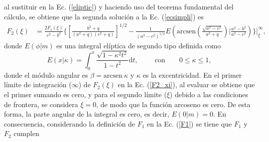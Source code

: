 al sustituir en la Ec. (\ref{eliptic}) y haciendo uso del teorema fundamental del cálculo, se obtiene que la segunda solución a la Ec. (\ref{ecsimpli}) es 
\begin{align}
    F_2(\xi)&=\frac{2F_1(\xi)}{c^2-b^2}\Bigg\{\left[\frac{b^2+q}{(a^2+q)(c^2+q)}\right]^{1/2}-\frac{1}{(a^2-c^2)^{1/2}}E\left(\mbox{arcsen}\left(\frac{\sqrt{a^2-c^2}}{a^2+q}\right)\Bigg|\frac{a^2-b^2}{a^2-c^2}\right)\Bigg\}\Bigg|_\xi^{\infty},
    \label{F2_xi}
\end{align}
donde $E(\phi|m)$ es una integral elíptica de segundo tipo definida como  \cite{Abramowitz}
\begin{equation}
    E(x|\kappa)=\int_{0}^x\frac{\sqrt{1-\kappa^2t^2}}{1-t^2}\text{d}t,\hspace{1cm}\text{con}\qquad 0\leq \kappa\leq 1,
\end{equation}
donde el módulo angular es $\beta=\mbox{arcsen}\:\kappa$ y $\kappa$ es la excentricidad. En el primer límite de integración ($\infty$) de $F_2(\xi)$ en la Ec. (\ref{F2_xi}), al evaluar se obtiene que el primer sumando es cero, y para el segundo límite ($\xi$) debido a las condiciones de frontera, se considera $\xi=0$, de modo que la función arcoseno es cero. De esta forma, la parte angular de la integral es cero, es decir, $E(0|m)=0$. En consecuencia, considerando la definición de $F_1$ en la Ec. (\ref{F1}) se tiene que $F_1$ y $F_2$ cumplen

